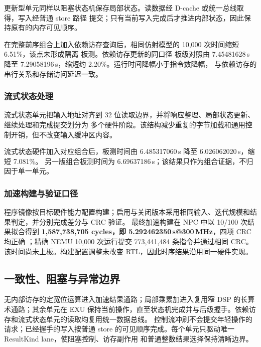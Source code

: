 

更新型单元同样以阻塞状态机保存局部状态。读数据经 D-cache 或统一总线取得，写入经普通 store 路径
提交；只有当前写入完成后才推进内部状态，因此保持原有的内存可见顺序。



在完整前序组合上加入依赖访存查询后，相同仿射模型的 10,000 次时间缩短 6.51\%，该点未形成隔离
板测。依赖访存更新的同口径
板级对照由 7.45481628\,s 降至 7.29058196\,s，缩短约 2.20\%。运行时间降幅小于指令数降幅，
与依赖访存的串行关系和存储访问延迟一致。

\subsubsection{流式状态处理}

流式状态单元把输入地址对齐到 32 位读取边界，并将响应整理、局部状态更新、继续处理和完成提交划分为
多个硬件阶段。该结构减少重复的字节加载和通用控制开销，但不改变输入缓冲区内容。



流式状态硬件加入对应组合后，板测时间由 6.485317060\,s 降至 6.026062020\,s，缩短 7.081\%。
另一版组合板测时间为 6.69637186\,s；该结果只作为组合证据，不归因于单一单元。

\subsubsection{加速构建与验证口径}

程序镜像按目标硬件能力配置构建；启用与关闭版本采用相同输入、迭代规模和结果判定，并分别完成差分与
CRC 验证。
最终加速构建在 NPC 中以 10/100 次结果拟合得到
\textbf{1,587,738,705 cycles，即 5.292462350\,s@300\,MHz}，四项 CRC 均正确
；精确 NEMU 10,000 次运行提交 773,441,484 条指令并通过相同 CRC。
该时间尚未上板。构建配置调整未改变 RTL，因此时序结果沿用同一硬件实现。
\subsection{一致性、阻塞与异常边界}

无内部访存的定宽位运算进入加速结果通路；局部乘累加进入复用窄 DSP 的长算术通路；其余单元在 EXU
保持当前操作，直至状态机完成并与后级握手。依赖访存和流式状态单元的读取均复用统一数据总线。
控制流冲刷不会提交年轻操作的请求；已经握手的写入按普通 store 的可见顺序完成。每个单元只驱动唯一 ResultKind lane，使阻塞控制、访存副作用
和普通整数结果选择保持清晰边界。
